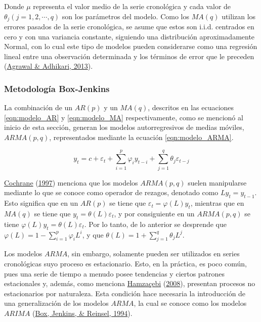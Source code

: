 \documentclass[
]{article}
\begin{document}
Donde \(\mu\) representa el valor medio de la serie cronológica y cada
valor de \(\theta_j(j=1,2,\cdots,q)\) son los parámetros del modelo.
Como los \(MA(q)\) utilizan los errores pasados de la serie cronológica,
se asume que estos son i.i.d. centrados en cero y con una variancia
constante, siguiendo una distribución aproximadamente Normal, con lo
cual este tipo de modelos pueden considerarse como una regresión lineal
entre una observación determinada y los términos de error que le
preceden (\protect\hyperlink{ref-stationary_def}{Agrawal \& Adhikari,
2013}).

\subsubsection{Metodología Box-Jenkins}

La combinación de un \(AR(p)\) y un \(MA(q)\), descritos en las
ecuaciones \ref{eqn:modelo_AR} y \ref{eqn:modelo_MA} respectivamente,
como se mencionó al inicio de esta sección, generan los modelos
autorregresivos de medias móviles, \(ARMA(p,q)\), representados mediante
la ecuación \ref{eqn:modelo_ARMA}.

\begin{equation}
\label{eqn:modelo_ARMA}
y_t=c+\varepsilon_t+\sum_{i=1}^p \varphi_iy_{t-i}+\sum_{j=1}^q \theta_j \varepsilon_{t-j}
\end{equation}

\protect\hyperlink{ref-Cochrane}{Cochrane}
(\protect\hyperlink{ref-Cochrane}{1997}) menciona que los modelos
\(ARMA(p,q)\) suelen manipularse mediante lo que se conoce como operador
de rezagos, denotado como \(Ly_t=y_{t-1}\). Esto significa que en un
\(AR(p)\) se tiene que \(\varepsilon_t=\varphi(L)y_t\), mientras que en
\(MA(q)\) se tiene que \(y_t=\theta(L)\varepsilon_t\), y por
consiguiente en un \(ARMA(p,q)\) se tiene
\(\varphi(L)y_t=\theta(L)\varepsilon_t\). Por lo tanto, de lo anterior
se desprende que \(\varphi(L)=1-\sum_{i=1}^p \varphi_iL^i\), y que
\(\theta(L)=1+\sum_{j=1}^q\theta_jL^j\).

Los modelos \(ARMA\), sin embargo, solamente pueden ser utilizados en
series cronológicas suyo proceso es estacionario. Esto, en la práctica,
es poco común, pues una serie de tiempo a menudo posee tendencias y
ciertos patrones estacionales y, además, como menciona
\protect\hyperlink{ref-Hamzacebi}{Hamzaçebi}
(\protect\hyperlink{ref-Hamzacebi}{2008}), presentan procesos no
estacionarios por naturaleza. Esta condición hace necesaria la
introducción de una generalización de los modelos \(ARMA\), la cual se
conoce como los modelos \(ARIMA\)
(\protect\hyperlink{ref-box-jenkins}{Box, Jenkins, \& Reinsel, 1994}).
\end{document}
